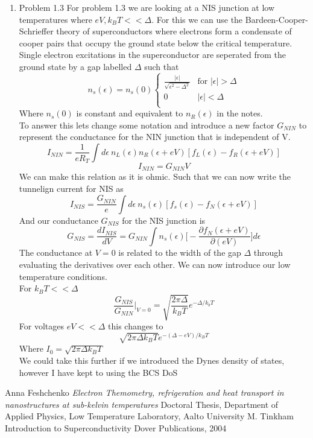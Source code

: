 \documentclass[12pt]{article}
\begin{document}
\begin{enumerate}
\item Problem 1.3
For problem 1.3 we are looking at a NIS junction at low temperatures where $eV, k_B T << \Delta $. For this we can use the Bardeen-Cooper-Schrieffer theory of superconductors where electrons form a condensate of cooper pairs that occupy the ground state below the critical temperature. Single electron excitations in the superconductor are seperated from the ground state by a gap labelled $\Delta$ such that 
\[ n_s (\epsilon) = n_s (0)
\begin{cases}
\frac{|\epsilon|}{\sqrt{\epsilon^2 - \Delta^2}}&\text{for $|\epsilon| > \Delta $}\\
0&\text{$|\epsilon| < \Delta$}\\
\end{cases}
\]
Where $n_s(0)$ is constant and equivalent to $n_R (\epsilon)$ in the notes. \\
To answer this lets change some notation and introduce \cite{2} a new factor $G_{NIN} $ to represent the conductance for the NIN junction that is independent of V. 
$$ I_{NIN} = \frac{1}{eR_T} \int d \epsilon \ n_L(\epsilon) n_R(\epsilon +eV)[f_L (\epsilon) - f_R (\epsilon + eV)] $$
$$ I_{NIN} = G_{NIN} V $$
We can make this relation as it is ohmic. Such that we can now write the tunnelign current for NIS as 
$$ I_{NIS} = \frac{G_{NIN}}{e} \int d \epsilon \ n_s (\epsilon) [f_s (\epsilon) - f_N (\epsilon + eV)] $$
And our conductance $G_{NIS}$ for the NIS junction is 
$$ G_{NIS} = \frac{d I_{NIS}}{d V} = G_{NIN} \int n_s (\epsilon) \Big[ -\frac{\partial f_N ( \epsilon + eV)}{\partial (eV)}\Big] d \epsilon $$
The conductance at $V=0$ is related to the width of the gap $\Delta$ through evaluating the derivatives over each other. We can now introduce our low temperature conditions. \\
For $k_B T << \Delta $ 
$$ \frac{G_{NIS}}{G_{NIN}} \Big|_{V=0} = \sqrt{\frac{2 \pi \Delta}{k_B T}} e^{- \Delta / k_b T} $$
For voltages $eV << \Delta$ this changes to 
$$ \sqrt{2 \pi \Delta k_B T } e^{-(\Delta - eV)/ k_B T} $$
Where $I_0 = \sqrt{2 \pi \Delta k_B T }$\\
We could take this further if we introduced the Dynes density of states, however I have kept to using the BCS DoS 




\end{enumerate}

\begin{thebibliography}{9}
    Anna Feshchenko
    \textit{Electron Themometry, refrigeration and heat transport in nanostructures at sub-kelvin temperatures}
    Doctoral Thesis, Department of Applied Physics, Low Temperature Laboratory, Aalto University
    M. Tinkham 
    Introduction to Superconductivity
    Dover Publications, 2004

\end{thebibliography}
\end{document}
